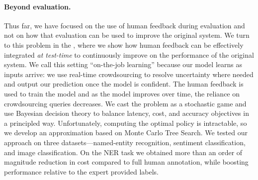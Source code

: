\paragraph{Beyond evaluation.}
Thus far, we have focused on the use of human feedback during evaluation and not on how that evaluation can be used to improve the original system.
We turn to this problem in the , where we show how human feedback can be effectively integrated \textit{at test-time} to continuously improve on the performance of the original system.
We call this setting  ``on-the-job learning'' because our model learns as inputs arrive: we use real-time crowdsourcing to resolve uncertainty where needed and output our prediction once the model is confident.
The human feedback is used to train the model and as the model improves over time, the reliance on crowdsourcing queries decreases. 
We cast the problem as a stochastic game and use Bayesian decision theory to balance latency, cost, and accuracy objectives in a principled way. 
Unfortunately, computing the optimal policy is intractable, so we develop an approximation based on Monte Carlo Tree Search.
We tested our approach on three datasets---named-entity recognition, sentiment classification, and image classification.
On the NER task we obtained more than an order of magnitude reduction in cost compared to full human annotation, while boosting performance relative to the expert provided labels.

